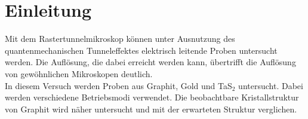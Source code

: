 \section{Einleitung}
Mit dem Rastertunnelmikroskop können unter Ausnutzung des quantenmechanischen Tunneleffektes elektrisch leitende Proben untersucht werden. Die Auflösung, die dabei erreicht werden kann, übertrifft die Auflösung von gewöhnlichen Mikroskopen deutlich.\\
In diesem Versuch werden Proben aus Graphit, Gold und TaS$_2$ untersucht. Dabei werden verschiedene Betriebsmodi verwendet. Die beobachtbare Kristallstruktur von Graphit wird näher untersucht und mit der erwarteten Struktur verglichen.  
